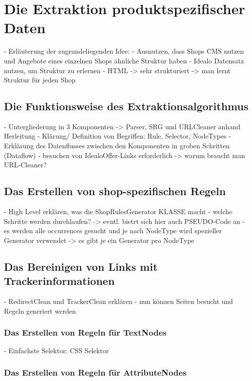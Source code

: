 \section{Die Extraktion produktspezifischer Daten}



- Erläuterung der zugrundeliegenden Idee:
	- Ausnutzen, dass Shops CMS nutzen und Angebote eines einzelnen Shops ähnliche Struktur haben
	- Idealo Datensatz nutzen, um Struktur zu erlernen
	- HTML -> sehr strukturiert -> man lernt Struktur für jeden Shop
\subsection{Die Funktionsweise des Extraktionsalgorithmus}

	- Untergliederung in 3 Komponenten -> Parser, SRG und URLCleaner anhand Herleitung
	- Klärung/ Definition von Begriffen: Rule, Selector, NodeTypes
	- Erklärung des Datenflusses zwischen den Komponenten in groben Schritten (Dataflow)
	- besuchen von IdealoOffer-Links erforderlich -> warum braucht man URL-Cleaner?
	
\subsection{Das Erstellen von shop-spezifischen Regeln}

	- High Level erklären, was die ShopRulesGenerator KLASSE macht
	- welche Schritte werden durchlaufen? -> evntl. bietrt sich hier auch PSEUDO-Code an
	- es werden alle occurrences gesucht und je nach NodeType wird spezieller Generator verwendet
	-> es gibt je ein Generator pro NodeType	
	
\subsection{Das Bereinigen von Links mit Trackerinformationen}
	- RedirectClean und TrackerClean erklären
	- nun können Seiten besucht und Regeln generiert werden	
	
\subsubsection{Das Erstellen von Regeln für TextNodes}

	- Einfachste Selektor: CSS Selektor

\subsubsection{Das Erstellen von Regeln für AttributeNodes}

